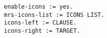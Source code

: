 \documentclass[a4paper]{article}
\begin{document}
{\small\begin{verbatim}
enable-icons := yes.
mrs-icons-list := ICONS LIST.
icons-left := CLAUSE.
icons-right := TARGET.
\end{verbatim}}
\end{document}
